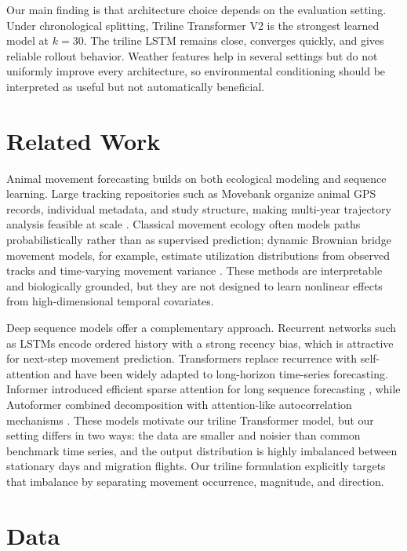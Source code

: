 \documentclass{article}
\begin{document}
Our main finding is that architecture choice depends on the evaluation setting. Under chronological splitting, Triline Transformer V2 is the strongest learned model at $k=30$. The triline LSTM remains close, converges quickly, and gives reliable rollout behavior. Weather features help in several settings but do not uniformly improve every architecture, so environmental conditioning should be interpreted as useful but not automatically beneficial.

\section{Related Work}

Animal movement forecasting builds on both ecological modeling and sequence learning. Large tracking repositories such as Movebank organize animal GPS records, individual metadata, and study structure, making multi-year trajectory analysis feasible at scale \cite{kranstauber2011movebank}. Classical movement ecology often models paths probabilistically rather than as supervised prediction; dynamic Brownian bridge movement models, for example, estimate utilization distributions from observed tracks and time-varying movement variance \cite{kranstauber2012dbbmm}. These methods are interpretable and biologically grounded, but they are not designed to learn nonlinear effects from high-dimensional temporal covariates.

Deep sequence models offer a complementary approach. Recurrent networks such as LSTMs encode ordered history with a strong recency bias, which is attractive for next-step movement prediction. Transformers replace recurrence with self-attention and have been widely adapted to long-horizon time-series forecasting. Informer introduced efficient sparse attention for long sequence forecasting \cite{zhou2021informer}, while Autoformer combined decomposition with attention-like autocorrelation mechanisms \cite{wu2021autoformer}. These models motivate our triline Transformer model, but our setting differs in two ways: the data are smaller and noisier than common benchmark time series, and the output distribution is highly imbalanced between stationary days and migration flights. Our triline formulation explicitly targets that imbalance by separating movement occurrence, magnitude, and direction.

\section{Data}
\end{document}
